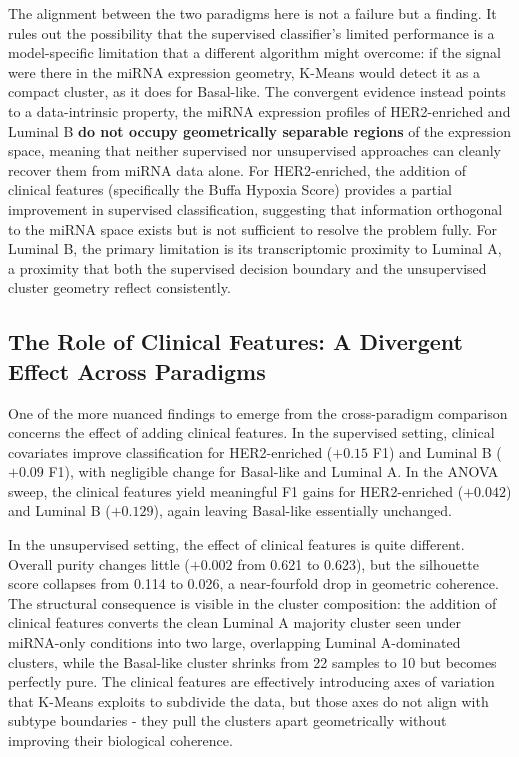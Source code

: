 The alignment between the two paradigms here is not a failure but a finding.
It rules out the possibility that the supervised classifier's limited performance is
a model-specific limitation that a different algorithm might overcome: if the signal
were there in the miRNA expression geometry, K-Means would detect it as a compact
cluster, as it does for Basal-like. The convergent evidence instead points to a
data-intrinsic property, the miRNA expression profiles of HER2-enriched and Luminal B
\textbf{do not occupy geometrically separable regions} of the expression space, meaning 
that neither supervised nor unsupervised approaches can cleanly recover them from
miRNA data alone. For HER2-enriched, the addition of clinical features (specifically the
Buffa Hypoxia Score) provides a partial improvement in supervised classification,
suggesting that information orthogonal to the miRNA space exists but is not sufficient
to resolve the problem fully. For Luminal B, the primary limitation is its
transcriptomic proximity to Luminal A, a proximity that both the supervised decision
boundary and the unsupervised cluster geometry reflect consistently.

\subsection{The Role of Clinical Features: A Divergent Effect Across Paradigms}

One of the more nuanced findings to emerge from the cross-paradigm comparison
concerns the effect of adding clinical features. In the supervised setting, clinical
covariates improve classification for HER2-enriched ($+0.15$ F1) and Luminal B
($+0.09$ F1), with negligible change for Basal-like and Luminal A. In the ANOVA
sweep, the clinical features yield meaningful F1 gains for HER2-enriched ($+0.042$)
and Luminal B ($+0.129$), again leaving Basal-like essentially unchanged.

In the unsupervised setting, the effect of clinical features is quite different.
Overall purity changes little ($+0.002$ from 0.621 to 0.623), but the silhouette
score collapses from 0.114 to 0.026, a near-fourfold drop in geometric coherence.
The structural consequence is visible in the cluster composition: the addition of
clinical features converts the clean Luminal A majority cluster seen under miRNA-only
conditions into two large, overlapping Luminal A-dominated clusters, while the
Basal-like cluster shrinks from 22 samples to 10 but becomes perfectly pure. The
clinical features are effectively introducing axes of variation that K-Means exploits
to subdivide the data, but those axes do not align with subtype boundaries - they
pull the clusters apart geometrically without improving their biological coherence.

